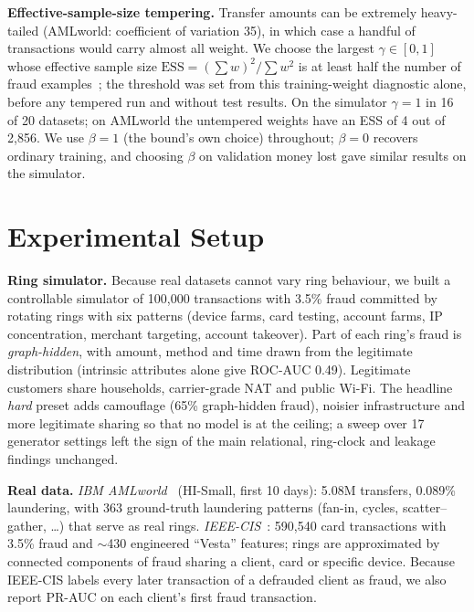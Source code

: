 \documentclass[10pt,letterpaper]{article}
\begin{document}
\textbf{Effective-sample-size tempering.} Transfer amounts can be extremely heavy-tailed (AMLworld: coefficient of variation 35), in which case a handful of transactions would carry almost all weight. We choose the largest $\gamma\in[0,1]$ whose effective sample size $\mathrm{ESS}=(\sum w)^2/\sum w^2$ is at least half the number of fraud examples~\cite{kong1992ess}; the threshold was set from this training-weight diagnostic alone, before any tempered run and without test results. On the simulator $\gamma=1$ in 16 of 20 datasets; on AMLworld the untempered weights have an ESS of 4 out of 2,856. We use $\beta=1$ (the bound's own choice) throughout; $\beta=0$ recovers ordinary training, and choosing $\beta$ on validation money lost gave similar results on the simulator.

\section{Experimental Setup}
\textbf{Ring simulator.} Because real datasets cannot vary ring behaviour, we built a controllable simulator of 100,000 transactions with 3.5\% fraud committed by rotating rings with six patterns (device farms, card testing, account farms, IP concentration, merchant targeting, account takeover). Part of each ring's fraud is \emph{graph-hidden}, with amount, method and time drawn from the legitimate distribution (intrinsic attributes alone give ROC-AUC 0.49). Legitimate customers share households, carrier-grade NAT and public Wi-Fi. The headline \emph{hard} preset adds camouflage (65\% graph-hidden fraud), noisier infrastructure and more legitimate sharing so that no model is at the ceiling; a sweep over 17 generator settings left the sign of the main relational, ring-clock and leakage findings unchanged.

\textbf{Real data.} \emph{IBM AMLworld}~\cite{altman2023aml} (HI-Small, first 10 days): 5.08M transfers, 0.089\% laundering, with 363 ground-truth laundering patterns (fan-in, cycles, scatter--gather, \dots) that serve as real rings. \emph{IEEE-CIS}~\cite{ieeecis2019}: 590,540 card transactions with 3.5\% fraud and $\sim$430 engineered ``Vesta'' features; rings are approximated by connected components of fraud sharing a client, card or specific device. Because IEEE-CIS labels every later transaction of a defrauded client as fraud, we also report PR-AUC on each client's first fraud transaction.
\end{document}
